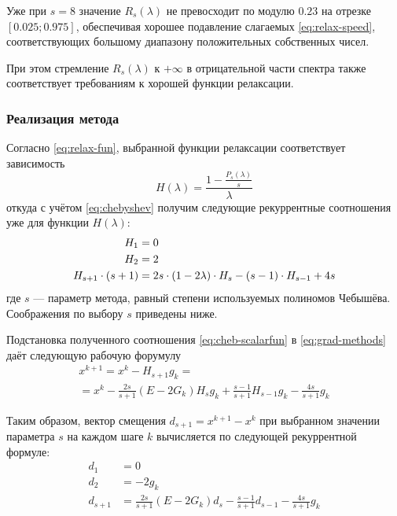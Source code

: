 

Уже при $s=8$ значение $R_s(\lambda)$ не превосходит по модулю $0.23$
на отрезке $[0.025; 0.975]$, обеспечивая хорошее подавление слагаемых
\eqref{eq:relax-speed}, соответствующих большому диапазону
положительных собственных чисел.

При этом стремление $R_s(\lambda)$ к $+\infty$ в
отрицательной части спектра также соответствует требованиям к хорошей
функции релаксации.

\subsubsection{Реализация метода}
Согласно \eqref{eq:relax-fun}, выбранной функции релаксации
соответствует зависимость
\begin{equation*}
  H(\lambda) = \frac{1-\frac{P_s(\lambda)}{s}}{\lambda}
\end{equation*}
откуда с учётом \eqref{eq:chebyshev} получим следующие рекуррентные
соотношения уже для функции $H(\lambda)$:
\begin{equation}
  \label{eq:cheb-scalarfun}
  \begin{aligned}
    H_1 &= 0 \\
    H_2 &= 2 \\
    H_{s+1} \cdot (s+1) &= 2s\cdot(1-2\lambda)\cdot H_s-(s-1)\cdot
    H_{s-1}+4s
  \end{aligned}
\end{equation}
где $s$ — параметр метода, равный степени используемых полиномов
Чебышёва. Соображения по выбору $s$ приведены ниже.

Подстановка полученного соотношения \eqref{eq:cheb-scalarfun}
в \eqref{eq:grad-methods} даёт следующую рабочую форумулу
\begin{multline}
  x^{k+1} = x^k - H_{s+1}g_k =\\=
  x^k-\frac{2s}{s+1}(E-2G_k)H_sg_k+\frac{s-1}{s+1}H_{s-1}g_k-\frac{4s}{s+1}g_k
\end{multline}

Таким образом, вектор смещения $d_{s+1} = x^{k+1} - x^k$ при выбранном
значении параметра $s$ на каждом шаге $k$ вычисляется по следующей
рекуррентной формуле:
\begin{equation}
  \label{eq:cheb-workhorse}
  \begin{aligned}
    d_1 &= 0\\
    d_2 &= -2g_k \\
    d_{s+1} &=
    \frac{2s}{s+1}(E-2G_k)d_{s}-\frac{s-1}{s+1}d_{s-1}-\frac{4s}{s+1}g_k
  \end{aligned}
\end{equation}


